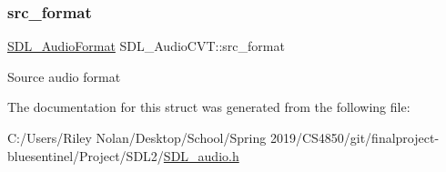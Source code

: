 \subsubsection{\texorpdfstring{src\_format}{src\_format}}
{\footnotesize\ttfamily \mbox{\hyperlink{_s_d_l__audio_8h_a491ed103fd25d920c4e6b7495217ce66}{S\+D\+L\+\_\+\+Audio\+Format}} S\+D\+L\+\_\+\+Audio\+C\+V\+T\+::src\+\_\+format}

Source audio format 

The documentation for this struct was generated from the following file\+:\begin{DoxyCompactItemize}
\item 
C\+:/\+Users/\+Riley Nolan/\+Desktop/\+School/\+Spring 2019/\+C\+S4850/git/finalproject-\/bluesentinel/\+Project/\+S\+D\+L2/\mbox{\hyperlink{_s_d_l__audio_8h}{S\+D\+L\+\_\+audio.\+h}}\end{DoxyCompactItemize}
